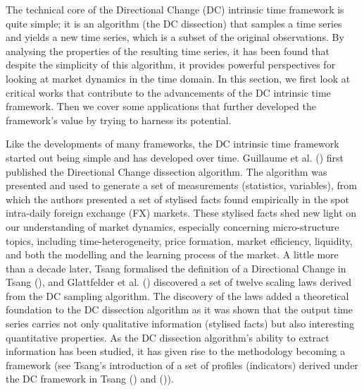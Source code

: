 The technical core of the Directional Change (DC) intrinsic time framework is quite simple; it is an algorithm (the DC dissection) that samples a time series and yields a new time series, which is a subset of the original observations. By analysing the properties of the resulting time series, it has been found that despite the simplicity of this algorithm, it provides powerful perspectives for looking at market dynamics in the time domain. In this section, we first look at critical works that contribute to the advancements of the DC intrinsic time framework. Then we cover some applications that further developed the framework's value by trying to harness its potential.

Like the developments of many frameworks, the DC intrinsic time framework started out being simple and has developed over time. Guillaume et al. (\citeyear{guillaume1997bird}) first published the Directional Change dissection algorithm. The algorithm was presented and used to generate a set of measurements (statistics, variables), from which the authors presented a set of stylised facts found empirically in the spot intra-daily foreign exchange (FX) markets. These stylised facts shed new light on our understanding of market dynamics, especially concerning micro-structure topics, including time-heterogeneity, price formation, market efficiency, liquidity, and both the modelling and the learning process of the market. A little more than a decade later, Tsang formalised the definition of a Directional Change in Tsang (\citeyear{tsang2010directional}), and Glattfelder et al. (\citeyear{glattfelder2011patterns}) discovered a set of twelve scaling laws derived from the DC sampling algorithm. The discovery of the laws added a theoretical foundation to the DC dissection algorithm as it was shown that the output time series carries not only qualitative information (stylised facts) but also interesting quantitative properties. As the DC dissection algorithm's ability to extract information has been studied, it has given rise to the methodology becoming a framework (see Tsang's introduction of a set of profiles (indicators) derived under the DC framework in Tsang (\citeyear{tsang2015profiling}) and (\citeyear{tsang2017profiling})).


